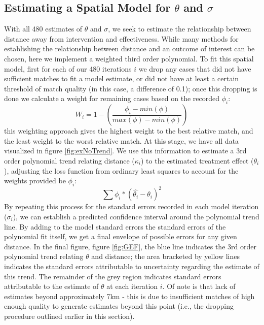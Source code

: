 \documentclass[sustainability,article,submit,moreauthors,pdftex]{Definitions/mdpi}
\begin{document}
\subsection{Estimating a Spatial Model for $\theta$ and $\sigma$}
With all 480 estimates of $\theta$ and $\sigma$, we seek to estimate the relationship between distance away from intervention and effectiveness.  While many methods for establishing the relationship between distance and an outcome of interest can be chosen, here we implement a weighted third order polynomial.  To fit this spatial model, first for each of our 480 iterations $i$ we drop any cases that did not have sufficient matches to fit a model estimate, or did not have at least a certain threshold of match quality (in this case, a difference of 0.1); once this dropping is done we calculate a weight for remaining cases based on the recorded $\phi_{i}$:
\begin{equation}
W_{i} = 1 - \left ( \frac{\phi_{i} - min(\phi)}{max(\phi) - min(\phi)}  \right )     
\end{equation}
this weighting approach gives the highest weight to the best relative match, and the least weight to the worst relative match.  At this stage, we have all data visualized in figure \ref{fig:exNoTrend}.  We use this information to estimate a 3rd order polynomial trend relating distance ($\kappa_{i}$) to the estimated treatment effect ($\theta_{i}$), adjusting the loss function from ordinary least squares to account for the weights provided be $\phi_{i}$:
\begin{equation}
\sum \phi_{i}*(\hat{\theta_{i}} - \theta_{i})^2
\end{equation}
By repeating this process for the standard errors recorded in each model iteration ($\sigma_{i}$), we can establish a predicted confidence interval around the polynomial trend line. By adding to the model standard errors the standard errors of the polynomial fit itself, we get a final envelope of possible errors for any given distance.  In the final figure, figure \ref{fig:GEF}, the blue line indicates the 3rd order polynomial trend relating $\theta$ and distance; the area bracketed by yellow lines indicates the standard errors attributable to uncertainty regarding the estimate of this trend.  The remainder of the grey region indicates standard errors attributable to the estimate of $\theta$ at each iteration $i$.  Of note is that lack of estimates beyond approximately 7km - this is due to insufficient matches of high enough quality to generate estimates beyond this point (i.e., the dropping procedure outlined earlier in this section).
\end{document}

